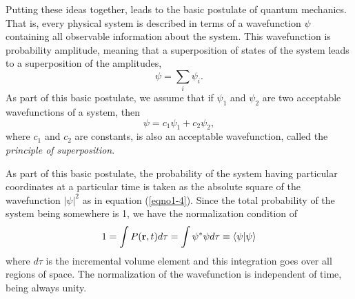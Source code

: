 Putting these ideas together, leads to the basic postulate of quantum
mechanics. That is, every physical system is described in terms of a
wavefunction $\psi$ containing all observable information about the
system. This wavefunction is probability amplitude, meaning that a
superposition of states of the system leads to a superposition of the
amplitudes,
\begin{equation}
\psi = \sum_{i} \psi_i .
\label{eqno1-5}
\end{equation}
As part of this basic postulate, we assume that if $\psi_1$ and
$\psi_2$ are two acceptable wavefunctions of a system, then
\begin{equation}
\psi = c_1 \psi_1 + c_2 \psi_2 ,
\label{eqno1-6}
\end{equation}
where $c_1$ and $c_2$ are constants, is also an acceptable wavefunction, 
called the \emph{principle of superposition}.

As part of this basic postulate, the probability of the system having
particular coordinates at a particular time is taken as the absolute
square of the wavefunction $| \psi |^2$ as in equation
(\ref{eqno1-4}). Since the total probability of the system being
somewhere is 1, we have the normalization condition of
\begin{equation}
1 = \int P ( {\bf r} , t ) d \tau = \int \psi^* \psi d \tau 
  \equiv \langle \psi | \psi \rangle
\label{eqno1-7}
\end{equation}
where $d\tau$ is the incremental volume element and this integration
goes over all regions of space. The normalization of the wavefunction
is independent of time, being always unity.

